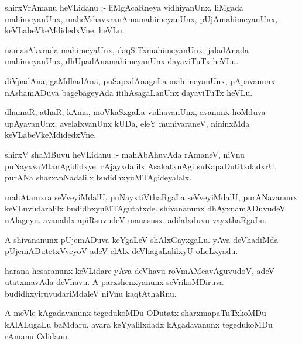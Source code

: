 \documentclass{article}
\begin{document}
\begin{mn}
shirxVrAmanu  heVLidanu :- liMgAcaRneya  vidhiyanUnx,  liMgada  mahimeyanUnx,  maheVshavxranAmamahimeyanUnx,  pUjAmahimeyanUnx,  
keVLabeVkeMdidedxVne,  heVLu.
\end{mn}

\begin{mn}
namasAkxrada  mahimeyaUnx,  daqSiTxmahimeyanUnx,  jaladAnada  mahimeyanUnx,  dhUpadAnamahimeyanUnx  dayaviTuTx  heVLu.
\end{mn}

\begin{mn}
diVpadAna,  gaMdhadAna,  puSapxdAnagaLa  mahimeyanUnx,  pApavanunx  nAshamADuva  bagebageyAda  itihAsagaLanUnx  dayaviTuTx  heVLu.
\end{mn}

\begin{mn}
dhamaR,  athaR,  kAma,  moVkaSxgaLa  vidhavanUnx,  avanunx  hoMduva  upAyavanUnx,  avelalxvanUnx  kUDa,  eleY  munivaraneV,  
nininxMda  keVLabeVkeMdidedxVne.
\end{mn}

\begin{mn}
shirxV  shaMBuvu  heVLidanu :- mahAbAhuvAda  rAmaneV,  niVnu  puNayxvaMtanAgididxye.  rAjayxdalilx  AsakatxnAgi  
suKapaDutitxdadxrU,  purANa  sharxvaNadalilx  budidhxyuMTAgideyalalx.
\end{mn}

\begin{mn}
mahAtamxra  seVveyiMdalU,  puNayxtiVthaRgaLa  seVveyiMdalU,  purANavanunx  keVLuvudaralilx  budidhxyuMTAgutatxde.  shivananunx  
dhAyxnamADuvudeV  nAlageyu.  avanalilx  apiRsuvudeV  manasusx.  adilalxduvu  vayxthaRgaLu.
\end{mn}

\begin{mn}
A shivananunx  pUjemADuva  keYgaLeV  shAlxGayxgaLu.  yAva  deVhadiMda  pUjemADutetxVveyoV  adeV  elAlx  deVhagaLalilxyU  oLeLxyadu.
\end{mn}

\begin{mn}
harana  hesaranunx  keVLidare  yAva  deVhavu  roVmAMcavAguvudoV,  adeV  utatxmavAda  deVhavu.  A  parxshenxyanunx  seVrikoMDiruva  
budidhxyiruvudariMdaleV  niVnu  kaqtAthaRnu.
\end{mn}

\begin{mn}
A meVle  kAgadavanunx  tegedukoMDu  ODutatx  sharxmapaTuTxkoMDu  kAlALugaLu  baMdaru.  avara  keYyalilxdadx  kAgadavanunx  tegedukoMDu  rAmanu  Odidanu.
\end{mn}
\end{document}
